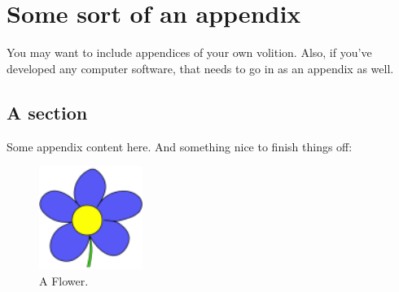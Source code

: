 
\chapter{Some sort of an appendix}
\label{appendix:somesort}

You may want to include appendices of your own volition. Also, if you've developed any computer software, that needs to go in as an appendix as well.

\section{A section}

Some appendix content here. And something nice to finish things off:

\begin{figure}[htb]
  \centering
  \includegraphics[width=0.3\textwidth]{graphics/mygraphic2.png}
  \caption{A Flower.}
\end{figure}

